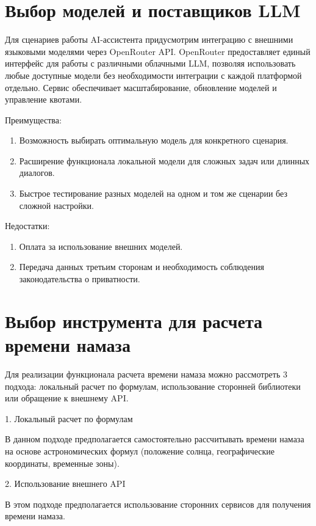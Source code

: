 \section{Выбор моделей и поставщиков LLM}


Для сценариев работы AI-ассистента придусмотрим интеграцию с внешними языковыми моделями через OpenRouter API. OpenRouter предоставляет единый интерфейс для работы с различными облачными LLM, позволяя использовать любые доступные модели без необходимости интеграции с каждой платформой отдельно. Сервис обеспечивает масштабирование, обновление моделей и управление квотами.


Преимущества:

\begin{enumerate}
	\item Возможность выбирать оптимальную модель для конкретного сценария.
	\item Расширение функционала локальной модели для сложных задач или длинных диалогов.
	\item Быстрое тестирование разных моделей на одном и том же сценарии без сложной настройки.
\end{enumerate}

Недостатки:

\begin{enumerate}
	\item Оплата за использование внешних моделей.
	\item Передача данных третьим сторонам и необходимость соблюдения законодательства о приватности.
\end{enumerate}

\section{Выбор инструмента для расчета времени намаза}


Для реализации функционала расчета времени намаза можно рассмотреть 3 подхода: локальный расчет по формулам, использование сторонней библиотеки или обращение к внешнему API.


1. Локальный расчет по формулам


В данном подходе предполагается самостоятельно рассчитывать времени намаза на основе астрономических формул (положение солнца, географические координаты, временные зоны).


2. Использование внешнего API


В этом подходе предполагается использование сторонних сервисов для получения времени намаза.


